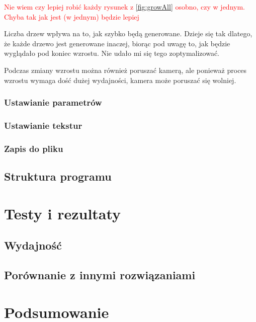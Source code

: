 \documentclass[a4paper,12pt,twoside]{book} %
\begin{document}
\textcolor{red}{Nie wiem czy 
lepiej robić każdy rysunek z \ref{fig:growAll} osobno, 
czy w jednym. Chyba tak jak jest (w jednym) będzie lepiej}

Liczba drzew wpływa na to, jak szybko będą generowane. 
Dzieje się tak dlatego, że każde drzewo jest generowane inaczej, 
biorąc pod uwagę to, jak będzie wyglądało pod koniec wzrostu.
Nie udało mi się tego zoptymalizować.

Podczas zmiany wzrostu można również poruszać kamerą, 
ale ponieważ proces wzrostu wymaga dość dużej wydajności, 
kamera może poruszać się wolniej.



\subsection{Ustawianie parametrów}

\subsection{Ustawianie tekstur}

\subsection{Zapis do pliku}

\section{Struktura programu}

\chapter{Testy i rezultaty}

\section{Wydajność}

\section{Porównanie z innymi rozwiązaniami}

\chapter{Podsumowanie}




\end{document}
